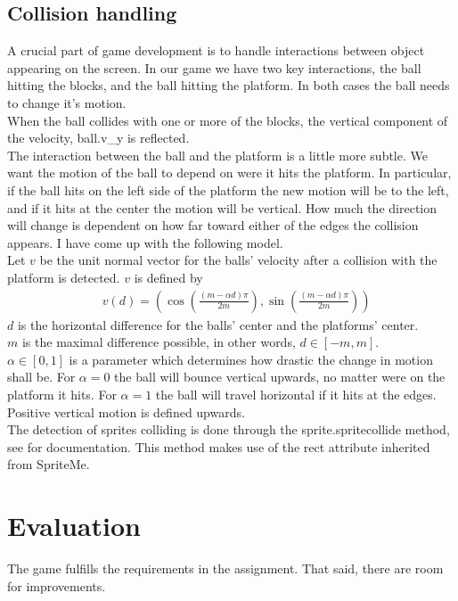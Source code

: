 \documentclass[12pt]{article}
\begin{document}
            \subsection{Collision handling}
                A crucial part of game development is to handle interactions between object appearing on the screen. In our game we have two key interactions, the ball hitting the blocks, and the ball hitting the platform. In both cases the ball needs to change it's motion. \\ 
                When the ball collides with one or more of the blocks, the vertical component of the velocity, ball.v\_y is reflected. \\
                The interaction between the ball and the platform is a little more subtle. We want the motion of the ball to depend on were it hits the platform. In particular, if the ball hits on the left side of the platform the new motion will be to the left, and if it hits at the center the motion will be vertical. How much the direction will change is dependent on how far toward either of the edges the collision appears. I have come up with the following model. \\[2mm]
                Let $ v $ be the unit normal vector for the balls' velocity after a collision with the platform is detected. $ v $ is defined by
                \begin{align}
                    & v(d) = \left( \cos \left(\frac{\left(m - \alpha d \right)\pi}{2m} \right),  \sin \left(\frac{\left(m - \alpha d \right)\pi}{2m} \right)\right) 
                \end{align}
               $ d $ is the horizontal difference for the balls' center and the platforms' center.\\
               $ m $ is the maximal difference possible, in other words, $ d \in [-m, m] $. \\
               $ \alpha \in [0, 1] $ is a parameter which determines how drastic the change in motion shall be. For $ \alpha = 0 $ the ball will bounce vertical upwards, no matter were on the platform it hits. For $ \alpha = 1 $ the ball will travel horizontal if it hits at the edges.
               Positive vertical motion is defined upwards. \\
               The detection of sprites colliding is done through the sprite.spritecollide method, see  \cite{Sprite} for documentation. This method makes use of the rect attribute inherited from SpriteMe. 
               
        \section{Evaluation} 
            The game fulfills the requirements in the assignment. That said, there are room for improvements. 
            
\end{document}
